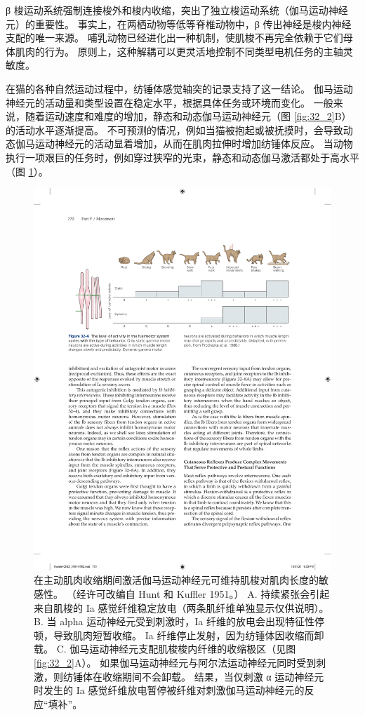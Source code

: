 β 梭运动系统强制连接梭外和梭内收缩，突出了独立梭运动系统（伽马运动神经元）的重要性。
事实上，在两栖动物等低等脊椎动物中，β 传出神经是梭内神经支配的唯一来源。 
哺乳动物已经进化出一种机制，使肌梭不再完全依赖于它们母体肌肉的行为。
原则上，这种解耦可以更灵活地控制不同类型电机任务的主轴灵敏度。


在猫的各种自然运动过程中，纺锤体感觉轴突的记录支持了这一结论。
伽马运动神经元的活动量和类型设置在稳定水平，根据具体任务或环境而变化。 
一般来说，随着运动速度和难度的增加，静态和动态伽马运动神经元（图 \ref{fig:32_2}B）的活动水平逐渐提高。 
不可预测的情况，例如当猫被抱起或被抚摸时，会导致动态伽马运动神经元的活动显着增加，从而在肌肉拉伸时增加纺锤体反应。 
当动物执行一项艰巨的任务时，例如穿过狭窄的光束，静态和动态伽马激活都处于高水平（图 \ref{fig:32_6}）。


\begin{figure}[htbp]
	\centering
	\includegraphics[width=0.9\linewidth]{chap32/fig_32_6}
	\caption{在主动肌肉收缩期间激活伽马运动神经元可维持肌梭对肌肉长度的敏感性。 （经许可改编自 Hunt 和 Kuffler 1951。） 
		A. 持续紧张会引起来自肌梭的 Ia 感觉纤维稳定放电（两条肌纤维单独显示仅供说明）。
		B. 当 alpha 运动神经元受到刺激时，Ia 纤维的放电会出现特征性停顿，导致肌肉短暂收缩。 Ia 纤维停止发射，因为纺锤体因收缩而卸载。
		C. 伽马运动神经元支配肌梭梭内纤维的收缩极区（见图 \ref{fig:32_2}A）。
		如果伽马运动神经元与阿尔法运动神经元同时受到刺激，则纺锤体在收缩期间不会卸载。
		结果，当仅刺激 α 运动神经元时发生的 Ia 感觉纤维放电暂停被纤维对刺激伽马运动神经元的反应“填补”。}
	\label{fig:32_6}
\end{figure}

